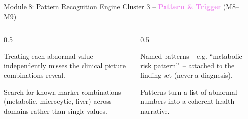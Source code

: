 \documentclass[9pt,aspectratio=169]{beamer}
\begin{document}
\begin{frame}{Module 8: Pattern Recognition Engine}
\textcolor{black!55}{\scriptsize Cluster 3 -- \textcolor{violet}{\textbf{Pattern \& Trigger}} (M8--M9)}\\[2pt]
\begin{columns}[T,onlytextwidth]
\begin{column}{0.5\textwidth}
\begin{tcolorbox}[colback=blue!7,colframe=blue!55!black,title=\textbf{Motivation},boxrule=0.6pt,arc=1mm,left=5pt,right=5pt,top=3pt,bottom=3pt,fonttitle=\small]
\footnotesize Treating each abnormal value independently misses the clinical picture combinations reveal.
\end{tcolorbox}
\vspace{5pt}
\begin{tcolorbox}[colback=teal!7,colframe=teal!55!black,title=\textbf{Method},boxrule=0.6pt,arc=1mm,left=5pt,right=5pt,top=3pt,bottom=3pt,fonttitle=\small]
\footnotesize Search for known marker combinations (metabolic, microcytic, liver) across domains rather than single values.
\end{tcolorbox}
\end{column}
\begin{column}{0.5\textwidth}
\begin{tcolorbox}[colback=green!8,colframe=green!45!black,title=\textbf{Result},boxrule=0.6pt,arc=1mm,left=5pt,right=5pt,top=3pt,bottom=3pt,fonttitle=\small]
\footnotesize Named patterns -- e.g. \textquotedblleft metabolic-risk pattern\textquotedblright\ -- attached to the finding set (never a diagnosis).
\end{tcolorbox}
\vspace{5pt}
\begin{tcolorbox}[colback=orange!10,colframe=orange!65!black,title=\textbf{Conclusion},boxrule=0.6pt,arc=1mm,left=5pt,right=5pt,top=3pt,bottom=3pt,fonttitle=\small]
\footnotesize Patterns turn a list of abnormal numbers into a coherent health narrative.
\end{tcolorbox}
\end{column}
\end{columns}
\end{frame}
\end{document}

